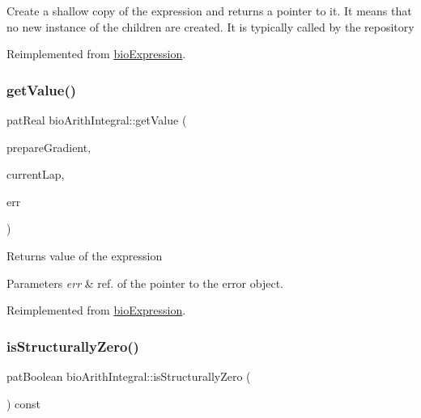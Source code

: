 Create a shallow copy of the expression and returns a pointer to it. It means that no new instance of the children are created. It is typically called by the repository 

Reimplemented from \hyperlink{classbio_expression_a442534762693b92baaf33928979a1bf8}{bio\+Expression}.

\mbox{\label{classbio_arith_integral_a71c94eed284b1ef9e492aa6424c33365}} 
\subsubsection{\texorpdfstring{get\+Value()}{getValue()}}
{\footnotesize\ttfamily pat\+Real bio\+Arith\+Integral\+::get\+Value (\begin{DoxyParamCaption}\item[{pat\+Boolean}]{prepare\+Gradient,  }\item[{pat\+U\+Long}]{current\+Lap,  }\item[{pat\+Error $\ast$\&}]{err }\end{DoxyParamCaption})\hspace{0.3cm}{\ttfamily [virtual]}}

\begin{DoxyReturn}{Returns}
value of the expression 
\end{DoxyReturn}

\begin{DoxyParams}{Parameters}
{\em err} & ref. of the pointer to the error object. \\
\hline
\end{DoxyParams}


Reimplemented from \hyperlink{classbio_expression_af58662a5d4d456f15bc4f2c9bd4f8a5b}{bio\+Expression}.

\mbox{\label{classbio_arith_integral_a7f96ce250c987eb2022512c9f65cdc1b}} 
\subsubsection{\texorpdfstring{is\+Structurally\+Zero()}{isStructurallyZero()}}
{\footnotesize\ttfamily pat\+Boolean bio\+Arith\+Integral\+::is\+Structurally\+Zero (\begin{DoxyParamCaption}{ }\end{DoxyParamCaption}) const\hspace{0.3cm}{\ttfamily [virtual]}}

